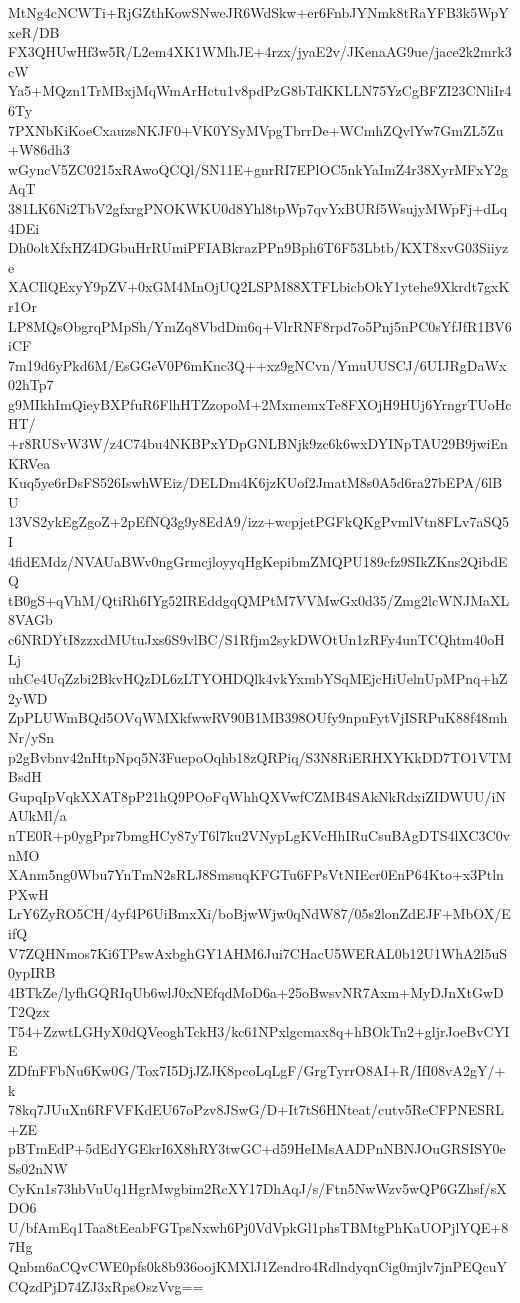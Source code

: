 MtNg4cNCWTi+RjGZthKowSNweJR6WdSkw+er6FnbJYNmk8tRaYFB3k5WpYxeR/DB
FX3QHUwHf3w5R/L2em4XK1WMhJE+4rzx/jyaE2v/JKenaAG9ue/jace2k2mrk3cW
Ya5+MQzn1TrMBxjMqWmArHctu1v8pdPzG8bTdKKLLN75YzCgBFZI23CNliIr46Ty
7PXNbKiKoeCxauzsNKJF0+VK0YSyMVpgTbrrDe+WCmhZQvlYw7GmZL5Zu+W86dh3
wGyncV5ZC0215xRAwoQCQl/SN11E+gnrRI7EPlOC5nkYaImZ4r38XyrMFxY2gAqT
381LK6Ni2TbV2gfxrgPNOKWKU0d8Yhl8tpWp7qvYxBURf5WsujyMWpFj+dLq4DEi
Dh0oltXfxHZ4DGbuHrRUmiPFIABkrazPPn9Bph6T6F53Lbtb/KXT8xvG03Siiyze
XACIlQExyY9pZV+0xGM4MnOjUQ2LSPM88XTFLbicbOkY1ytehe9Xkrdt7gxKr1Or
LP8MQsObgrqPMpSh/YmZq8VbdDm6q+VlrRNF8rpd7o5Pnj5nPC0sYfJfR1BV6iCF
7m19d6yPkd6M/EsGGeV0P6mKnc3Q++xz9gNCvn/YmuUUSCJ/6UIJRgDaWx02hTp7
g9MIkhImQieyBXPfuR6FlhHTZzopoM+2MxmemxTe8FXOjH9HUj6YrngrTUoHcHT/
+r8RUSvW3W/z4C74bu4NKBPxYDpGNLBNjk9zc6k6wxDYINpTAU29B9jwiEnKRVea
Kuq5ye6rDsFS526IswhWEiz/DELDm4K6jzKUof2JmatM8s0A5d6ra27bEPA/6lBU
13VS2ykEgZgoZ+2pEfNQ3g9y8EdA9/izz+wcpjetPGFkQKgPvmlVtn8FLv7aSQ5I
4fidEMdz/NVAUaBWv0ngGrmcjloyyqHgKepibmZMQPU189cfz9SIkZKns2QibdEQ
tB0gS+qVhM/QtiRh6IYg52IREddgqQMPtM7VVMwGx0d35/Zmg2lcWNJMaXL8VAGb
c6NRDYtI8zzxdMUtuJxs6S9vlBC/S1Rfjm2sykDWOtUn1zRFy4unTCQhtm40oHLj
uhCe4UqZzbi2BkvHQzDL6zLTYOHDQlk4vkYxmbYSqMEjcHiUelnUpMPnq+hZ2yWD
ZpPLUWmBQd5OVqWMXkfwwRV90B1MB398OUfy9npuFytVjISRPuK88f48mhNr/ySn
p2gBvbnv42nHtpNpq5N3FuepoOqhb18zQRPiq/S3N8RiERHXYKkDD7TO1VTMBsdH
GupqIpVqkXXAT8pP21hQ9POoFqWhhQXVwfCZMB4SAkNkRdxiZIDWUU/iNAUkMl/a
nTE0R+p0ygPpr7bmgHCy87yT6l7ku2VNypLgKVcHhIRuCsuBAgDTS4lXC3C0vnMO
XAnm5ng0Wbu7YnTmN2sRLJ8SmsuqKFGTu6FPsVtNIEcr0EnP64Kto+x3PtlnPXwH
LrY6ZyRO5CH/4yf4P6UiBmxXi/boBjwWjw0qNdW87/05s2lonZdEJF+MbOX/EifQ
V7ZQHNmos7Ki6TPswAxbghGY1AHM6Jui7CHacU5WERAL0b12U1WhA2l5uS0ypIRB
4BTkZe/lyfhGQRIqUb6wlJ0xNEfqdMoD6a+25oBwsvNR7Axm+MyDJnXtGwDT2Qzx
T54+ZzwtLGHyX0dQVeoghTckH3/kc61NPxlgcmax8q+hBOkTn2+gljrJoeBvCYIE
ZDfnFFbNu6Kw0G/Tox7I5DjJZJK8pcoLqLgF/GrgTyrrO8AI+R/IfI08vA2gY/+k
78kq7JUuXn6RFVFKdEU67oPzv8JSwG/D+It7tS6HNteat/cutv5ReCFPNESRL+ZE
pBTmEdP+5dEdYGEkrI6X8hRY3twGC+d59HeIMsAADPnNBNJOuGRSISY0eSs02nNW
CyKn1s73hbVuUq1HgrMwgbim2RcXY17DhAqJ/s/Ftn5NwWzv5wQP6GZhsf/sXDO6
U/bfAmEq1Taa8tEeabFGTpsNxwh6Pj0VdVpkGl1phsTBMtgPhKaUOPjlYQE+87Hg
Qnbm6aCQvCWE0pfs0k8b936oojKMXlJ1Zendro4RdlndyqnCig0mjlv7jnPEQcuY
CQzdPjD74ZJ3xRpsOszVvg==
